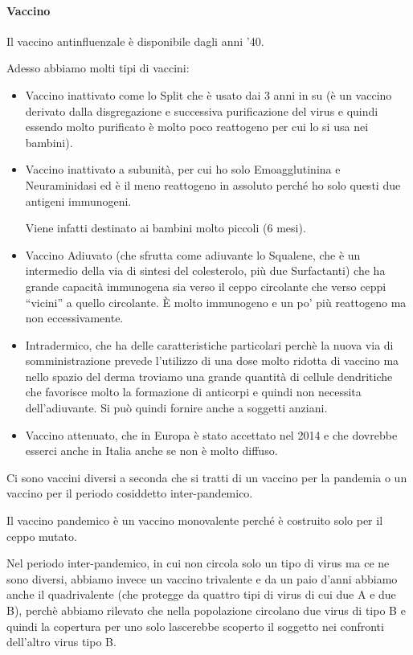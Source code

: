 \paragraph{Vaccino}


Il vaccino antinfluenzale è disponibile dagli anni '40.

Adesso abbiamo molti tipi di vaccini:
\begin{itemize}
\item 
  Vaccino inattivato come lo Split che è usato dai 3 anni in su (è un
vaccino derivato dalla disgregazione e successiva purificazione del
virus e quindi essendo molto purificato è molto poco reattogeno per cui
lo si usa nei bambini).
\item 
  Vaccino inattivato a subunità, per cui ho solo Emoagglutinina e
Neuraminidasi ed è il meno reattogeno in assoluto perché ho solo questi
due antigeni immunogeni.

Viene infatti destinato ai bambini molto piccoli (6 mesi).
\item 
  Vaccino Adiuvato (che sfrutta come adiuvante lo Squalene, che è un
intermedio della via di sintesi del colesterolo, più due Surfactanti)
che ha grande capacità immunogena sia verso il ceppo circolante che
verso ceppi ``vicini'' a quello circolante. È molto immunogeno e un po'
più reattogeno ma non eccessivamente.
\item 
  Intradermico, che ha delle caratteristiche particolari perchè la nuova
via di somministrazione prevede l'utilizzo di una dose molto ridotta di
vaccino ma nello spazio del derma troviamo una grande quantità di
cellule dendritiche che favorisce molto la formazione di anticorpi e
quindi non necessita dell'adiuvante. Si può quindi fornire anche a
soggetti anziani.
\item 
  Vaccino attenuato, che in Europa è stato accettato nel 2014 e che
dovrebbe esserci anche in Italia anche se non è molto diffuso.
\end{itemize}
Ci sono vaccini diversi a seconda che si tratti di un vaccino per la
pandemia o un vaccino per il periodo cosiddetto inter-pandemico.

Il vaccino pandemico è un vaccino monovalente perché è costruito solo
per il ceppo mutato.

Nel periodo inter-pandemico, in cui non circola solo un tipo di virus ma
ce ne sono diversi, abbiamo invece un vaccino trivalente e da un paio
d'anni abbiamo anche il quadrivalente (che protegge da quattro tipi di
virus di cui due A e due B), perchè abbiamo rilevato che nella
popolazione circolano due virus di tipo B e quindi la copertura per uno
solo lascerebbe scoperto il soggetto nei confronti dell'altro virus tipo
B.

